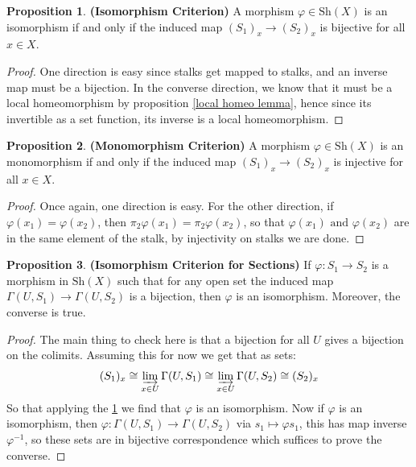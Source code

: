 \documentclass[10.5pt]{article}
\theoremstyle{definition}
\newtheorem{proposition}{Proposition}
\newcommand{\tand}{\text{ and }}
\newcommand{\colim}{\varinjlim}
\begin{document}
    \begin{proposition}\textbf{(Isomorphism Criterion)} \makeatletter\def\@currentlabel{Isomorphism Criterion}\makeatother \label{Isomorphism Criterion}
        A morphism \(\varphi \in \text{Sh}(X)\) is an isomorphism if and only if the induced map \((S_1)_x \to (S_2)_x\) is bijective for all \(x \in X\).
    \end{proposition}
    \begin{proof}
        One direction is easy since stalks get mapped to stalks, and an inverse map must be a bijection. In the converse direction, we know that it must be a local homeomorphism by proposition \ref{local homeo lemma}, hence since its invertible as a set function, its inverse is a local homeomorphism.
    \end{proof}
    \begin{proposition}\textbf{(Monomorphism Criterion)}
        A morphism \(\varphi \in \text{Sh}(X)\) is an monomorphism if and only if the induced map \((S_1)_x \to (S_2)_x\) is injective for all \(x \in X\).
    \end{proposition}
    \begin{proof}
        Once again, one direction is easy. For the other direction, if \(\varphi(x_1) = \varphi(x_2)\), then \(\pi_2 \varphi(x_1) = \pi_2 \varphi(x_2)\), so that \(\varphi(x_1) \tand \varphi(x_2)\) are in the same element of the stalk, by injectivity on stalks we are done.
    \end{proof}
    \begin{proposition}\textbf{(Isomorphism Criterion for Sections)}
        If \(\varphi: S_1 \to S_2\) is a morphism in \(\text{Sh}(X)\) such that for any open set the induced map \(\Gamma(U,S_1) \to \Gamma(U,S_2)\) is a bijection, then \(\varphi\) is an isomorphism. Moreover, the converse is true.
    \end{proposition}
    \begin{proof}
        The main thing to check here is that a bijection for all \(U\) gives a bijection on the colimits. Assuming this for now we get that as sets:
        \begin{align*}
            (S_1)_x \cong \colim_{x \in U} \Gamma(U,S_1) \cong \colim_{x \in U} \Gamma(U,S_2) \cong (S_2)_x
        \end{align*}
        So that applying the \ref{Isomorphism Criterion} we find that \(\varphi\) is an isomorphism. Now if \(\varphi\) is an isomorphism, then \(\varphi: \Gamma(U,S_1) \to \Gamma(U,S_2)\) via \(s_1 \mapsto \varphi s_1\), this has map inverse \(\varphi^{-1}\), so these sets are in bijective correspondence which suffices to prove the converse.
    \end{proof}
    
\end{document}

